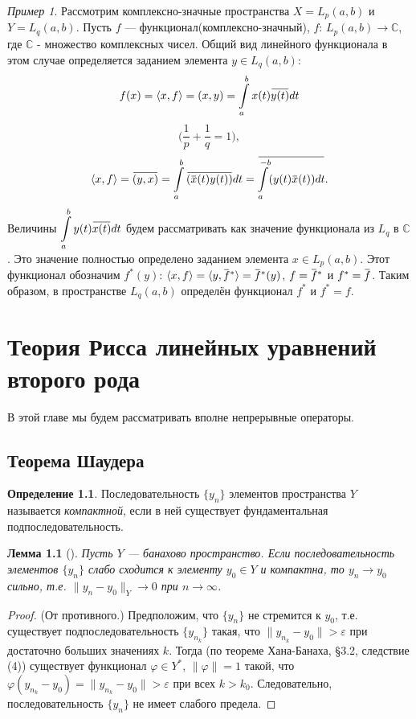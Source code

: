\documentclass[12pt,a4paper,titlepage,oneside]{book}
\newcommand{\overbar}[1]{\mkern 1.5mu\overline{\mkern-1.5mu#1\mkern-1.5mu}\mkern 1.5mu}
\newcommand{\rom}[1]{\uppercase\expandafter{\romannumeral #1\relax}}
\theoremstyle{definition}
\newtheorem*{definition}{Определение}
\theoremstyle{plain}
\theoremstyle{break}
\theoremstyle{remark}
\theoremstyle{remark}
\newtheorem*{example}{Пример}
\theoremstyle{remark}
\theoremstyle{remark}
\theoremstyle{plain}
\newtheorem*{lemma}{Лемма}
\theoremstyle{plain}
\begin{document}
\begin{example}
Рассмотрим комплексно-значные пространства $X=L_p(a,b)$ и $Y=L_q(a,b)$. Пусть $f$ --- функционал(комплексно-значный), $f$: $L_p(a,b) \to \mathbb{C}$, где $\mathbb{C}$ - множество комплексных чисел. Общий вид линейного функционала в этом случае определяется заданием элемента $y \in L_q(a,b)$:
$$f(x) = \langle x, f \rangle = (x,y) = \displaystyle\int\limits_a^b x(t)\overbar{y(t)}dt$$
$$\Big( \frac{1}{p} + \frac{1}{q} = 1 \Big),$$
$$ \langle x, f \rangle  = \overbar{(y,x)}  = \displaystyle\int\limits_a^b \overbar{(\overbar{x}(t)y(t))} dt = \overbar{\displaystyle\int\limits_a^{-b} (y(t)\overbar{x}(t))dt}.$$
Величины $\displaystyle\int\limits_a^b y(t)\overbar{x(t)} dt$ будем рассматривать как значение функционала из $L_q$ в $\mathbb{C}$. Это значение полностью определено заданием элемента $x \in L_p(a,b)$. Этот функционал обозначим $f^{*}(y)$:
$\langle x,f \rangle = \langle y,\overbar{f}^{*} \rangle = \overbar{f}^{*}(y)$, $f=\overbar{f}^{*}$ и $f^{*}=\overbar{f}$.
Таким образом, в пространстве $L_q(a,b)$ определён функционал $f^{*}$ и $f^{*}=f$.
\end{example}

\chapter{Теория Рисса линейных уравнений второго рода}

В этой главе мы будем рассматривать вполне непрерывные операторы.

\section{Теорема Шаудера}

\begin{definition}
Последовательность $\{y_n\}$ элементов пространства $Y$ называется \textit{компактной}, если в ней существует фундаментальная подпоследовательность.
\end{definition}

\begin{lemma}[\rom{1}]
Пусть $Y$ --- банахово пространство. Если последовательность элементов $\{y_n\}$ слабо сходится к элементу $y_0 \in Y$ и компактна, то $y_n\to y_0$ сильно, т.е. \mbox{$\lVert y_n - y_0\rVert_Y\to 0$} при $n\to\infty$.
\end{lemma}

\begin{proof}
(От противного.) Предположим, что $\{y_n\}$ не стремится к $y_0$, т.е. существует подпоследовательность $\{y_{n_k}\}$ такая, что $\lVert  y_{n_k} - y_0 \rVert > \varepsilon$ при достаточно больших значениях $k$. Тогда (по теореме Хана-Банаха, \S 3.2, следствие (4)) существует функционал $\varphi\in Y^*$, $\lVert\varphi\rVert=1$ такой, что $\varphi(y_{n_k} - y_0) = \lVert y_{n_k} - y_0 \rVert > \varepsilon$ при всех $k > k_0$. Следовательно, последовательность $\{y_n\}$ не имеет слабого предела.
\end{proof}
\end{document}
